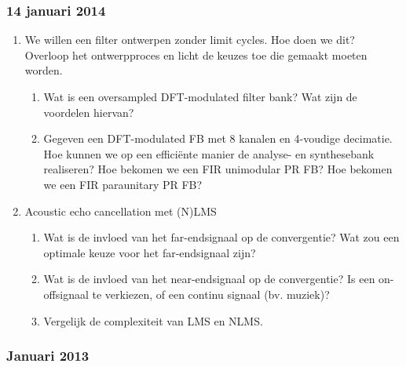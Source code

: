 \documentclass[
  a4paper,
  ,captions=tableheading
]{scrartcl}
\providecommand{\tightlist}{%
  \setlength{\itemsep}{0pt}\setlength{\parskip}{0pt}}
\begin{document}
\subsubsection{\texorpdfstring{\textbf{14 januari
2014}}{14 januari 2014}}\label{januari-2014}

\begin{enumerate}
\def\labelenumi{\arabic{enumi}.}
\tightlist
\item
  We willen een filter ontwerpen zonder limit cycles. Hoe doen we dit?
  Overloop het ontwerpproces en licht de keuzes toe die gemaakt moeten
  worden.

  \begin{enumerate}
  \def\labelenumii{\arabic{enumii}.}
  \tightlist
  \item
    Wat is een oversampled DFT-modulated filter bank? Wat zijn de
    voordelen hiervan?\\
  \item
    Gegeven een DFT-modulated FB met 8 kanalen en 4-voudige decimatie.
    Hoe kunnen we op een efficiënte manier de analyse- en synthesebank
    realiseren? Hoe bekomen we een FIR unimodular PR FB? Hoe bekomen we
    een FIR paraunitary PR FB?\\
  \end{enumerate}
\item
  Acoustic echo cancellation met (N)LMS

  \begin{enumerate}
  \def\labelenumii{\arabic{enumii}.}
  \tightlist
  \item
    Wat is de invloed van het far-endsignaal op de convergentie? Wat zou
    een optimale keuze voor het far-endsignaal zijn?\\
  \item
    Wat is de invloed van het near-endsignaal op de convergentie? Is een
    on-offsignaal te verkiezen, of een continu signaal (bv. muziek)?\\
  \item
    Vergelijk de complexiteit van LMS en NLMS.
  \end{enumerate}
\end{enumerate}

\subsubsection{\texorpdfstring{\textbf{Januari
2013}}{Januari 2013}}\label{januari-2013}
\end{document}
